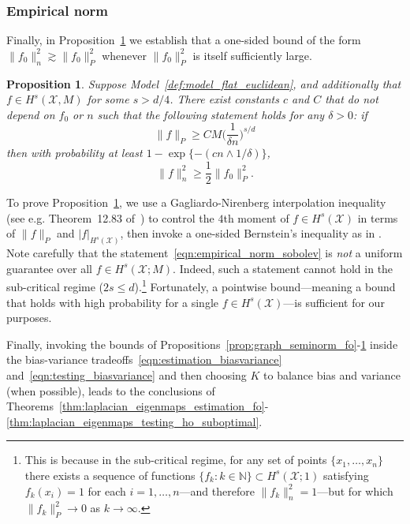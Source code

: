 \documentclass[aos]{imsart}
\theoremstyle{plain}
\newtheorem{proposition}{Proposition}
\theoremstyle{definition}
\theoremstyle{remark}
\newcommand{\mc}[1]{\mathcal{#1}}
\newcommand{\1}{\mathbf{1}}
\begin{document}
\subsubsection{Empirical norm}
Finally, in Proposition~\ref{prop:empirical_norm_sobolev} we establish that a one-sided bound of the form $\|f_0\|_n^2 \gtrsim \|f_0\|_P^2$ whenever $\|f_0\|_P^2$ is itself sufficiently large.
\begin{proposition}
	\label{prop:empirical_norm_sobolev}
	Suppose Model~\ref{def:model_flat_euclidean}, and additionally that $f \in H^s(\mc{X},M)$ for some $s > d/4$. There exist constants $c$ and $C$ that do not depend on $f_0$ or $n$ such that the following statement holds for any $\delta > 0$:  if
	\begin{equation}
	\label{eqn:empirical_norm_sobolev_1}
	\|f\|_{P} \geq C M \biggl(\frac{1}{\delta n}\biggr)^{s/d}
	\end{equation}
	then with probability at least $1 - \exp\{-(cn \wedge 1/\delta)\}$,
	\begin{equation}
	\label{eqn:empirical_norm_sobolev}
	\|f\|_n^2 \geq \frac{1}{2} \|f_0\|_P^2.
	\end{equation}
\end{proposition}
To prove Proposition~\ref{prop:empirical_norm_sobolev}, we use a Gagliardo-Nirenberg interpolation inequality (see e.g. Theorem~12.83 of~\citep{leoni2017}) to control the $4$th moment of $f \in H^s(\mc{X})$ in terms of $\|f\|_P$ and $|f|_{H^s(\mc{X})}$, then invoke a one-sided Bernstein's inequality as in \cite[Section 14.2]{wainwright2019}. Note carefully that the statement~\eqref{eqn:empirical_norm_sobolev} is \emph{not} a uniform guarantee over all $f \in H^s(\mc{X};M)$. Indeed, such a statement cannot hold in the sub-critical regime ($2s \leq d$).\footnote{This is because in the sub-critical regime, for any set of points $\{x_1,\ldots,x_n\}$ there exists a sequence of functions $\{f_k:k \in \mathbb{N}\} \subset H^s(\mc{X};1)$ satisfying $f_k(x_i) = 1$ for each $i = 1,\ldots,n$---and therefore $\|f_k\|_n^2 = 1$---but for which $\|f_k\|_P^2 \to 0$ as $k \to \infty$.} Fortunately, a pointwise bound---meaning a bound that holds with high probability for a single $f \in H^s(\mc{X})$---is sufficient for our purposes.

Finally, invoking the bounds of Propositions~\ref{prop:graph_seminorm_fo}-\ref{prop:empirical_norm_sobolev} inside the bias-variance tradeoffs~\eqref{eqn:estimation_biasvariance} and~\eqref{eqn:testing_biasvariance} and then choosing $K$ to balance bias and variance (when possible), leads to the conclusions of Theorems~\ref{thm:laplacian_eigenmaps_estimation_fo}-\ref{thm:laplacian_eigenmaps_testing_ho_suboptimal}.
\end{document}
